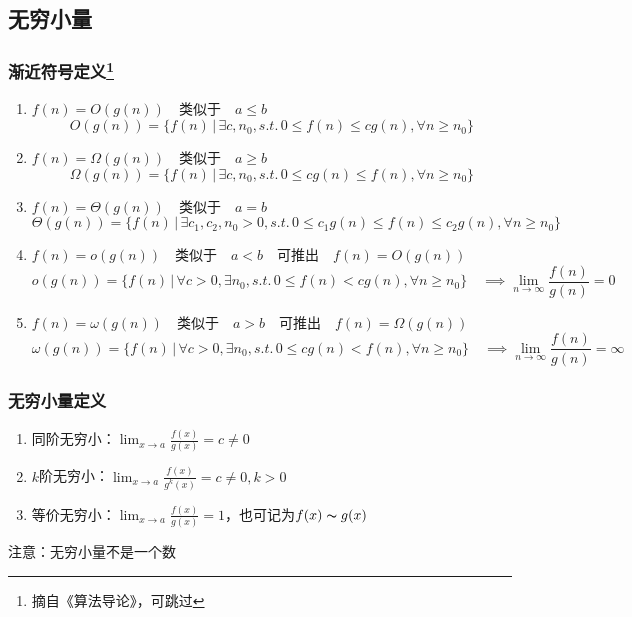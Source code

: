 \subsection{无穷小量}
\subsubsection{渐近符号定义\protect\footnote{摘自《算法导论》，可跳过}}
\begin{enumerate}
	\item $f(n)=O(g(n))\quad$类似于$\quad a\leq b$
	\[O(g(n))=\{f(n)\,|\,\exists c,n_0,s.t.\,0\leq f(n)\leq cg(n),\forall n\geq n_0\}\]
	\item $f(n)=\Omega(g(n))\quad$类似于$\quad a\geq b$
	\[\Omega(g(n))=\{f(n)\,|\,\exists c,n_0,s.t.\,0\leq cg(n)\leq f(n),\forall n\geq n_0\}\]
	\item $f(n)=\Theta(g(n))\quad$类似于$\quad a=b$
	\[\Theta(g(n))=\{f(n)\,|\,\exists c_1,c_2,n_0>0,s.t.\,0\leq c_1g(n)\leq f(n)\leq c_2g(n),\forall n\geq n_0\}\]
	\item $f(n)=o(g(n))\quad$类似于$\quad a<b\quad$可推出$\quad f(n)=O(g(n))$
	\[o(g(n))=\{f(n)\,|\,\forall c>0,\exists n_0,s.t.\,0\leq f(n)< cg(n),\forall n\geq n_0\}\quad\implies\lim_{n\to\infty}\frac{f(n)}{g(n)}=0\]
	\item $f(n)=\omega(g(n))\quad$类似于$\quad a>b\quad$可推出$\quad f(n)=\Omega(g(n))$
	\[\omega(g(n))=\{f(n)\,|\,\forall c>0,\exists n_0,s.t.\,0\leq cg(n)< f(n),\forall n\geq n_0\}\quad\implies\lim_{n\to\infty}\frac{f(n)}{g(n)}=\infty\]
\end{enumerate}

\subsubsection{无穷小量定义}
\begin{enumerate}
	\item 同阶无穷小：$\displaystyle\lim_{x\to a}\frac{f(x)}{g(x)}=c\ne 0$
	\item $k$阶无穷小：$\displaystyle\lim_{x\to a}\frac{f(x)}{g^k(x)}=c\ne 0,k>0$
	\item 等价无穷小：$\displaystyle\lim_{x\to a}\frac{f(x)}{g(x)}=1$，也可记为$f(x)\thicksim g(x)$
\end{enumerate}
注意：无穷小量不是一个数

